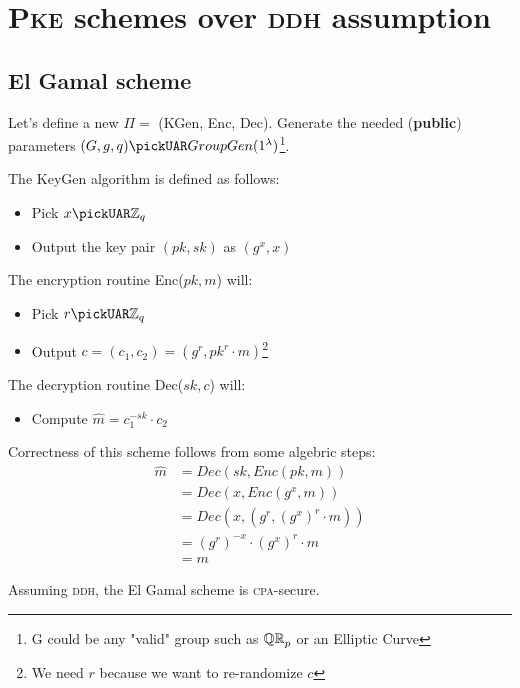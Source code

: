 \section{\textsc{Pke} schemes over \textsc{ddh} assumption}
\subsection{El Gamal scheme}
Let's define a new $\Pi=$ (KGen, Enc, Dec). Generate the needed (\textbf{public}) parameters $(G,g,q)\pickUAR GroupGen(1^{\lambda})$\footnote{G could be any "valid" group such as $\QR[p]$ or an Elliptic Curve}.

The KeyGen algorithm is defined as follows:
\begin{itemize}
    \item Pick $x \pickUAR \mathbb{Z}_q$
    \item Output the key pair $(pk, sk)$ as $(g^x, x)$
\end{itemize}
The encryption routine Enc($pk, m$) will:
\begin{itemize}
    \item Pick $r\pickUAR \mathbb{Z}_q$
    \item Output $c=(c_1, c_2)=(g^r, pk^r \cdot m)$\footnote{We need $r$ because we want to re-randomize $c$}
\end{itemize}
The decryption routine Dec($sk, c$) will:
\begin{itemize}
    \item Compute $\hat{m} = c_1^{-sk} \cdot c_2$
\end{itemize}
Correctness of this scheme follows from some algebric steps:
\begin{align*}
    \hat{m} &= Dec(sk, Enc(pk, m)) \\
    &= Dec(x, Enc(g^x, m)) \\
    &= Dec(x, (g^r, (g^x)^r \cdot m)) \\
    &= (g^r)^{-x} \cdot (g^x)^r \cdot m \\
    &= m
\end{align*}

\begin{theorem}
    Assuming \textsc{ddh}, the El Gamal scheme is \textsc{cpa}-secure.
\end{theorem}

